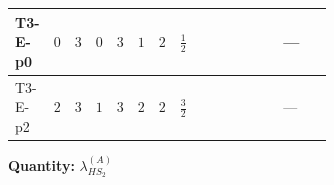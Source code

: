 \documentclass[8pt]{article}
\begin{document}
\begin{landscape}
\begin{longtable}{@{}llcccccc >{\raggedright\arraybackslash}p{0.21\linewidth} >{\raggedright\arraybackslash}p{0.21\linewidth} >{\raggedright\arraybackslash}p{0.21\linewidth}@{}}
\midrule
T3-E-p0 & $0$ & $3$ & $0$ & $3$ & $1$ & $2$ & $\frac{1}{2}$ & \scriptsize\adjustbox{max width=\linewidth}{$\begin{gathered} +8 {\lambda_{HS_2}^{(1)}} {\lambda_{HS_2}^{(A)}}\end{gathered}$} & \scriptsize\adjustbox{max width=\linewidth}{$\begin{gathered} +2 {\lambda_{HS_2}^{(A)}} {\lambda_{S_2}^{(1)}}\end{gathered}$} & --- \\
\midrule
T3-E-p2 & $2$ & $3$ & $1$ & $3$ & $2$ & $2$ & $\frac{3}{2}$ & \scriptsize\adjustbox{max width=\linewidth}{$\begin{gathered} +8 {\lambda_{HS_2}^{(1)}} {\lambda_{HS_2}^{(A)}}\end{gathered}$} & \scriptsize\adjustbox{max width=\linewidth}{$\begin{gathered} +2 {\lambda_{HS_2}^{(A)}} {\lambda_{S_2}^{(1)}}\end{gathered}$} & --- \\
\midrule
\bottomrule
\end{longtable}
\clearpage
\noindent\textbf{Quantity: }$\lambda_{HS_2}^{(A)}$\par\smallskip

\end{landscape}
\end{document}
